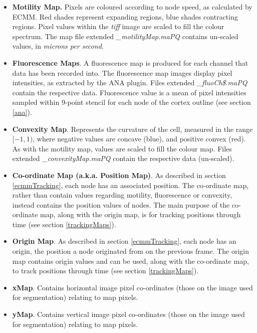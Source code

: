 \documentclass[a4paper,12pt]{article}
\begin{document}
\begin{itemize}

\item \textbf{Motility Map.}   Pixels are coloured according to node speed, as calculated by ECMM.  Red shades 
represent expanding regions, blue shades contracting regions.  Pixel values
within the \textit{tiff} image are scaled to fill the colour spectrum.  The map file extended \textit{\_motilityMap.maPQ} contains 
un-scaled values, in \textit{microns per second}. 

\item \textbf{Fluorescence Maps}.  A fluorescence map is produced for each channel that data has been 
recorded into.  The fluorescence map images display pixel intensities, as extracted by the ANA plugin.
Files extended \textit{\_fluoCh\$.maPQ} contain the respective data. Fluorescence value is a mean of pixel intensities sampled within 9-point stencil for each node of the cortex outline (see section \ref{ana}).

\item \textbf{Convexity Map}.   Represents the curvature of the cell, measured in the range $[-1,1)$, where negative values are concave (blue),
and positive convex (red).
As with the motility map, values
are scaled to fill the colour map. Files extended \textit{\_convexityMap.maPQ} contain the respective data (un-scaled). 

\item \textbf{Co-ordinate Map (a.k.a. Position Map)}.  As described in section \ref{ecmmTracking}, each node has an
associated position.  The co-ordinate map, rather than contain values regarding
motility, fluorescence or convexity, instead contains the position values of nodes.  The main
purpose of the co-ordinate map, along with the origin map, is for tracking positions through time (see section \ref{trackingMaps}).

\item \textbf{Origin Map}. As described in section \ref{ecmmTracking}, each node has an origin, the position a node originated from
on the previous frame.  The origin map contains origin values and can be used, along
with the co-ordinate map, to track positions through time (see section \ref{trackingMaps}).

\item \textbf{xMap}.  Contains horizontal image pixel co-ordinates (those on the image used for segmentation) relating to map pixels.

\item \textbf{yMap}.  Contains vertical image pixel co-ordinates (those on the image used for segmentation) relating to map pixels.

\end{itemize}
\end{document}
